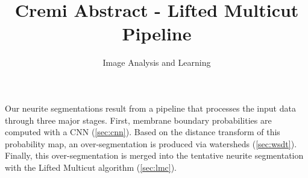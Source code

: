 \documentclass[runningheads,a4paper]{llncs}
\begin{document}


\title{Cremi Abstract - Lifted Multicut Pipeline}

\author{Image Analysis and Learning}

%
\iffalse
\author{Firstname Lastname\inst{1} \and Firstname Lastname\inst{2} }

\institute{
Insitute 1\\
\email{...}\and
Insitute 2\\
\email{...}
}
\fi
			
\maketitle

%


%
%
%

Our neurite segmentations result from a pipeline that processes the input data through three major stages.
First, membrane boundary probabilities are computed with a CNN (\cref{sec:cnn}). Based on the distance transform of this probability map, an over-segmentation is produced via watersheds (\cref{sec:wsdt}).
Finally, this over-segmentation is merged into the tentative neurite segmentation with the Lifted Multicut algorithm (\cref{sec:lmc}).
\end{document}
